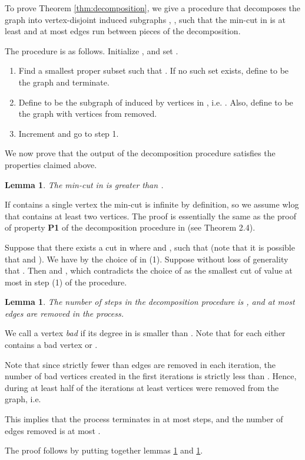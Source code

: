 \documentclass[11pt]{article}
\newtheorem{lemma}[theorem]{Lemma}
\newenvironment{proof}{{\bf Proof:}}{\par}
\newenvironment{proofof}[1]{\noindent{\bf Proof of #1:}}{\par}
\begin{document}
To prove Theorem \ref{thm:decomposition}, we give a procedure that decomposes the graph  into vertex-disjoint induced subgraphs , ,  such that the min-cut in  is at least  and at most  edges run between pieces of the decomposition. 


The procedure is as follows. Initialize , and set .
\begin{enumerate}
\item Find a smallest proper subset  such that . If no such set exists, define  to be the graph  and terminate. 
\item Define  to be the subgraph of  induced by vertices in , i.e. . Also, define  to be the graph  with vertices from  removed.
\item Increment  and go to step 1.	
\end{enumerate}

We now prove that the output of the decomposition procedure satisfies the properties claimed above.
\begin{lemma}\label{lm:mincut}
The min-cut in  is greater than .
\end{lemma}
\begin{proof}
If  contains a single vertex the min-cut is infinite by definition, so we assume wlog that  contains at least two vertices.
The proof is essentially the same as the proof of property \textbf{P1} of the decomposition procedure in \cite{gkk:rbp08} (see Theorem 2.4).

Suppose that there exists a cut  in  where  and
, such that  (note that it is possible that  and ).  We have  by the choice of  in (1). Suppose without loss of generality that .
Then  and , which contradicts the choice of  as the smallest cut of value at most  in step (1) of the procedure.
\end{proof}


\begin{lemma} \label{lm:edges-removed}
The number of steps in the decomposition procedure is , and at most  edges are removed in the process.
\end{lemma}
\begin{proof}
We call a vertex  {\em bad} if its degree in  is smaller than . Note that for each  either  contains a bad vertex or . 

Note that since strictly fewer than  edges are removed in each iteration, the number of bad vertices created in the first  iterations is strictly less than .  Hence, during at least half of the  iterations at least  vertices were removed from the graph, i.e.

This implies that the process terminates in at most  steps, and the number of edges removed is at most .
\end{proof}
\begin{proofof}{Theorem \ref{thm:decomposition}}
The proof follows by putting together lemmas \ref{lm:mincut} and \ref{lm:edges-removed}.
\end{proofof}
\end{document}
